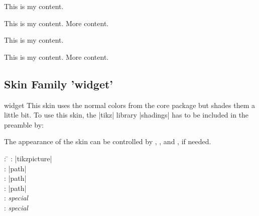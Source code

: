 \begin{dispExample}
\begin{tcbraster}[beamer,skin=beamerlast,raster equal height,raster columns=4,
    colback=LightGreen,colframe=DarkGreen,
    left=1mm,right=1mm,top=1mm,bottom=1mm,middle=1mm]
  \begin{tcolorbox}
    This is my content.
  \end{tcolorbox}
  \begin{tcolorbox}
    This is my content.
    \tcblower
    More content.
  \end{tcolorbox}
  \begin{tcolorbox}[adjusted title=My title]
    This is my content.
  \end{tcolorbox}
  \begin{tcolorbox}[adjusted title=My title]
    This is my content.
    \tcblower
    More content.
  \end{tcolorbox}
\end{tcbraster}
\end{dispExample}



\clearpage
\subsection{Skin Family 'widget'}
\begin{docSkin}{widget}
  This skin uses the normal colors from the core package but shades
  them a little bit. To use this skin, the |tikz| library |shadings|
  has to be included in the preamble by:
\begin{dispListing}
\usetikzlibrary{shadings}
\end{dispListing}
The appearance of the skin can be controlled by ,
, and ,
if needed.
\begin{tcolorbox}[skintable=widget]
  \begin{tabbing}
    : \=\kill
    :  \> |tikzpicture|\\ 
    :           \> |path|\\
    : \> |path|\\ 
    :        \> |path|\\
    :    \> \emph{special}\\
    :           \> \emph{special}
  \end{tabbing}
\end{tcolorbox}
\end{docSkin}


